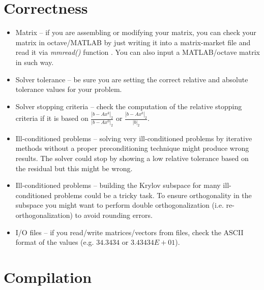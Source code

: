 \section{Correctness}
\label{remark-correctness}

\begin{itemize}
\itemsep0em

\item Matrix -- if you are assembling or modifying your matrix, you can check your matrix in octave/MATLAB by just writing it into a matrix-market file and read it via \emph{mmread()} function \cite{mm-read}. You can also input a MATLAB/octave matrix in such way.

\item Solver tolerance -- be sure you are setting the correct relative and absolute tolerance values for your problem.

\item Solver stopping criteria -- check the computation of the relative stopping criteria if it is based on $\frac{|b-Ax^k|_{2}}{|b-Ax^0|_{2}}$ or $\frac{|b-Ax^k|_{2}}{|b|_{2}}$.

\item Ill-conditioned problems -- solving very ill-conditioned problems by iterative methods without a proper preconditioning technique might produce wrong results. The solver could stop by showing a low relative tolerance based on the residual but this might be wrong. 

\item Ill-conditioned problems -- building the Krylov subspace for many ill-conditioned problems could be a tricky task. To ensure orthogonality in the subspace you might want to perform double orthogonalization (i.e. re-orthogonalization) to avoid rounding errors.

\item I/O files -- if you read/write matrices/vectors from files, check the ASCII format of the values (e.g. $34.3434$ or $3.43434E+01$).

\end{itemize}


\section{Compilation}
\label{remark-compilation}

